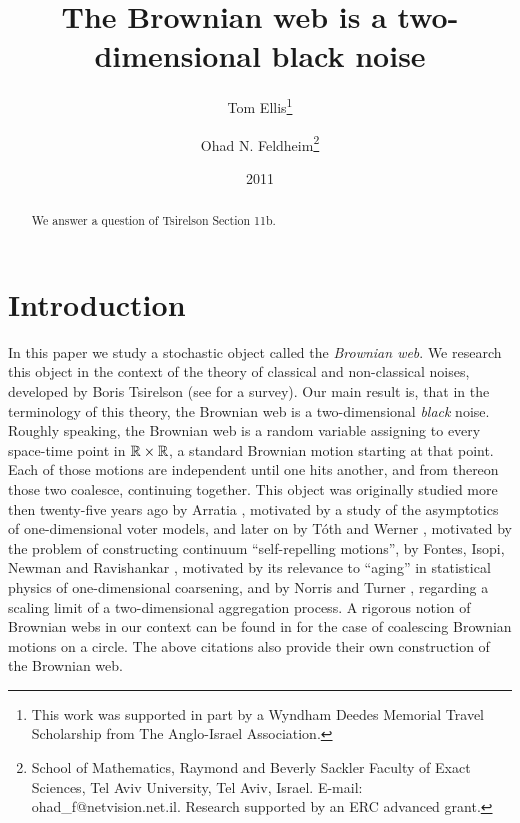 \newcommand{\sigfield}{$\sigma$-field}
{
\title{The Brownian web is a two-dimensional black noise}

\newcommand{\tomthanks}{This work was supported in part by
a Wyndham Deedes Memorial Travel Scholarship from The Anglo-Israel
Association.}

\newcommand{\ohadthanks}{School of Mathematics, Raymond and Beverly Sackler Faculty of Exact
Sciences, Tel Aviv University, Tel Aviv, Israel. E-mail:
ohad\_f@netvision.net.il. Research supported by an ERC advanced grant.}

\author{Tom Ellis\thanks{\tomthanks}\\%
\and Ohad N. Feldheim\thanks{\ohadthanks}}

\date{2011}

\maketitle

\begin{abstract}
We answer a question of
Tsirelson \cite{tsirelson-nonclassical-stochastic-flows} Section 11b.

\end{abstract}

\section{Introduction}
In this paper we study a stochastic object called the \emph{Brownian web}. We
research this object in the context of the theory of classical and
non-classical noises, developed by Boris Tsirelson
(see \cite{tsirelson-nonclassical-stochastic-flows} for a survey).
Our main result
is, that in the terminology of this theory, the Brownian web is a
two-dimensional \emph{black} noise.
Roughly speaking, the Brownian web is a random variable assigning to
every space-time point in $\mathbb{R}\times\mathbb{R}$, a standard Brownian motion starting
at that point. Each of those motions are independent until one hits another,
and from thereon those two coalesce, continuing together. This object was
originally studied more then twenty-five years ago by Arratia \cite{arratia}, motivated
by a study of the asymptotics of one-dimensional voter models, and later on
by T\'{o}th and Werner \cite{toth-werner},
motivated by the problem of constructing continuum
``self-repelling motions'', by Fontes, Isopi, Newman and Ravishankar
\cite{fontes-et-al},
motivated by its relevance to ``aging'' in statistical physics of
one-dimensional coarsening, and by Norris and Turner
\cite{norris-turner-convergence-to-bw},\cite{norris-turner-planar-aggregation}
regarding a scaling limit of a two-dimensional aggregation process.
A rigorous notion of Brownian webs in our context
can be found in \cite{tsirelson-lecture-course} for the case of coalescing
Brownian motions on a circle.  The above citations also provide
their own construction of the Brownian web.

}
